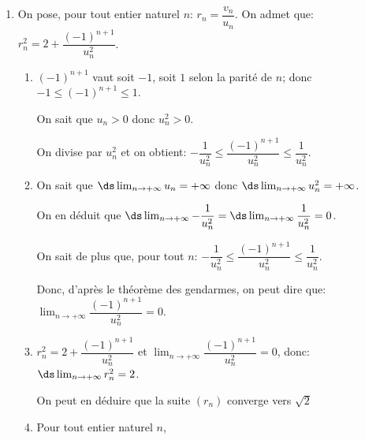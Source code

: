 \begin{enumerate}
\begin{enumerate}
		
On a donc démontré que, pour tout entier naturel $n$, $u_n\geqslant n+1$.		
		
		\item Pour tout $n$, $u_n\geqslant n+1$; or $\ds\lim_{n\to +\infty} n+1=+\infty$, donc par comparaison, $\ds\lim_{n\to +\infty} u_n=+\infty$.

	\end{enumerate}
	\item On pose, pour tout entier naturel $n$: $r_n = \dfrac{v_n}{u_n}.$
On admet que: $r_n^2 = 2 + \dfrac{(- 1)^{n+1}}{u_n^2}$.

	\begin{enumerate}
		\item 
$(-1)^{n+1}$ vaut soit $-1$, soit $1$ selon la parité de $n$; donc $-1\leqslant (-1)^{n+1} \leqslant 1$.

On sait que $u_n>0$ donc $u_n^2>0$.

On divise par $u_n^2$ et on obtient:
$- \dfrac{1}{u_n^2} \leqslant \dfrac{(- 1)^{n+1}}{u_n^2} \leqslant \dfrac{1}{u_n^2}.$

		\item
On sait que $\ds\lim_{n\to +\infty} u_n=+\infty$ donc $\ds\lim_{n\to +\infty} u_n^2=+\infty$. 

On en déduit que $\ds\lim_{n\to +\infty} -\dfrac{1}{u_n^2} = \ds\lim_{n\to +\infty} \dfrac{1}{u_n^2} = 0$.

On sait de plus que, pour tout $n$:  $- \dfrac{1}{u_n^2} \leqslant \dfrac{(- 1)^{n+1}}{u_n^2} \leqslant \dfrac{1}{u_n^2}$.
		
Donc, d'après le théorème des gendarmes, on peut dire que:
$\displaystyle\lim_{n \to + \infty} \dfrac{(- 1)^{n+1}}{u_n^2}=0$.

		\item 
$r_n^2 = 2 + \dfrac{(- 1)^{n+1}}{u_n^2}$ et $\displaystyle\lim_{n \to + \infty} \dfrac{(- 1)^{n+1}}{u_n^2}=0$, donc: $\ds\lim_{n \to +\infty} r_n^2=2$.

On peut en déduire que la suite $(r_n)$ converge vers $\sqrt{2}$
		
		\item  Pour tout entier naturel $n$,
		

\end{enumerate}
\end{enumerate}
